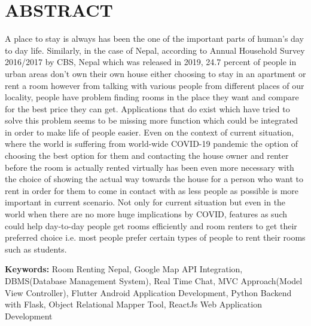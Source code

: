 \setcounter{page}{1}
\chapter*{ABSTRACT}
\thispagestyle{plain} 
A place to stay is always has been the one of the important parts of  human’s day to day life. Similarly, in the case of Nepal, according to Annual Household Survey 2016/2017 by CBS, Nepal \cite{householdsurvey} which was released in 2019, 24.7 percent of people in urban areas don’t own their own house either choosing to stay in an apartment or rent a room however from talking with various people from different places of our locality, people have problem finding rooms in the place they want and compare for the best price they can get. Applications that do exist which have tried to solve this problem seems to be missing more function which could be integrated in order to make life of people easier. Even on the context of current situation, where the world is suffering from world-wide COVID-19 pandemic the option of choosing the best option for them and contacting the house owner and renter before the room is actually rented virtually has been even more necessary with the choice of showing the actual way towards the house for a person who want to rent in order for them to come in contact with as less people as possible is more important in current scenario. Not only for current situation but even in the world when there are no more huge implications by COVID, features as such could help day-to-day people get rooms efficiently and room renters to get their preferred choice i.e. most people prefer certain types of people to rent their rooms such as students. 
\par
\textbf{Keywords:} Room Renting Nepal, Google Map API Integration, DBMS(Database Management System), Real Time Chat, MVC Approach(Model View Controller), Flutter Android Application Development, Python Backend with Flask, Object Relational Mapper Tool, ReactJs Web Application Development
\newpage